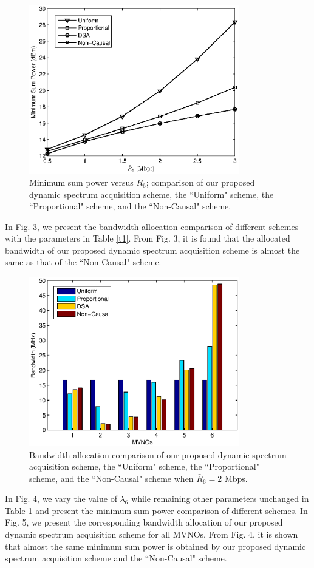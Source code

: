 \documentclass[journal]{IEEEtran}
\begin{document}
\begin{figure}
\centering
\includegraphics[width=3.6in]{fig2.eps}
\caption{Minimum sum power versus $\bar{R}_6$; comparison of our proposed dynamic spectrum acquisition scheme, the ``Uniform" scheme, the ``Proportional" scheme, and the ``Non-Causal" scheme.}
\end{figure}

In Fig. 3, we present the bandwidth allocation comparison of different schemes{
	\color{red}
	with the parameters in Table \ref{t1}}. From Fig. 3, it is found that the allocated bandwidth of our proposed dynamic spectrum acquisition scheme is almost the same as that of the ``Non-Causal" scheme.

\begin{figure}
\centering
\includegraphics[width=3.6in]{fig3.eps}
\caption{Bandwidth allocation comparison of our proposed dynamic spectrum acquisition scheme, the ``Uniform" scheme, the ``Proportional" scheme, and the ``Non-Causal" scheme when $\bar{R}_6=2$ Mbps.}
\end{figure}

In Fig. 4, we vary the value of $\lambda_6$ while remaining{
	\color{red}
	other parameters unchanged in Table 1
}and present the minimum sum power comparison of different schemes. In Fig. 5, we present the corresponding bandwidth allocation of our proposed dynamic spectrum acquisition scheme for all MVNOs. From Fig. 4, it is shown that almost the same minimum sum power is obtained by our proposed dynamic spectrum acquisition scheme and the ``Non-Causal" scheme.
\end{document}

